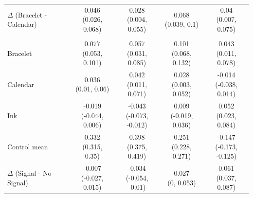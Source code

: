 {\begin{tabular}[t]{lcccc}
\addlinespace 
\hspace{1em}$\Delta$ (Bracelet - Calendar) & \makecell[c]{0.046\\(0.026, 0.068)} & \makecell[c]{0.028\\(0.004, 0.055)} & \makecell[c]{0.068\\(0.039, 0.1)} & \makecell[c]{0.04\\(0.007, 0.075)}\\
\addlinespace 
\addlinespace[0.3em]
\hline
\multicolumn{5}{l}{\textit{\textbf{Panel B: Perceived Observability}}}\\
\hline
\hspace{1em}Bracelet & \makecell[c]{0.077\\(0.053, 0.101)} & \makecell[c]{0.057\\(0.031, 0.085)} & \makecell[c]{0.101\\(0.068, 0.132)} & \makecell[c]{0.043\\(0.011, 0.078)}\\
\addlinespace 
\hspace{1em}Calendar & \makecell[c]{0.036\\(0.01, 0.06)} & \makecell[c]{0.042\\(0.011, 0.071)} & \makecell[c]{0.028\\(0.003, 0.052)} & \makecell[c]{-0.014\\(-0.038, 0.014)}\\
\addlinespace 
\hspace{1em}Ink & \makecell[c]{-0.019\\(-0.044, 0.006)} & \makecell[c]{-0.043\\(-0.073, -0.012)} & \makecell[c]{0.009\\(-0.019, 0.036)} & \makecell[c]{0.052\\(0.023, 0.084)}\\
\midrule
\addlinespace 
\hspace{1em}Control mean & \makecell[c]{0.332\\(0.315, 0.35)} & \makecell[c]{0.398\\(0.375, 0.419)} & \makecell[c]{0.251\\(0.228, 0.271)} & \makecell[c]{-0.147\\(-0.173, -0.125)}\\
\addlinespace 
\hspace{1em}$\Delta$ (Signal - No Signal) & \makecell[c]{-0.007\\(-0.027, 0.015)} & \makecell[c]{-0.034\\(-0.054, -0.01)} & \makecell[c]{0.027\\(0, 0.053)} & \makecell[c]{0.061\\(0.037, 0.087)}\\

\end{tabular}}
